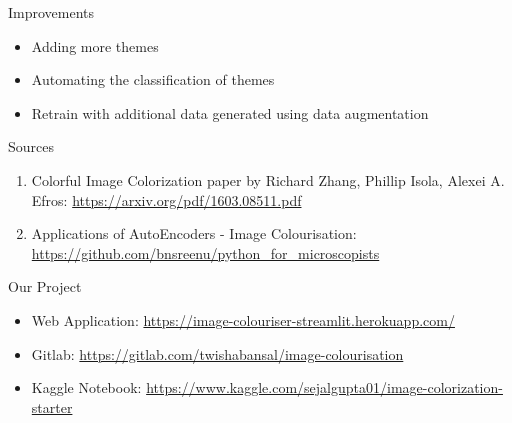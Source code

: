 \documentclass[12pt]{beamer}
\begin{document}
\begin{frame}{Improvements}
	\begin{itemize}
		\item Adding more themes
		\item Automating the classification of themes
		\item Retrain with additional data generated using data augmentation
	\end{itemize}
\end{frame}

\begin{frame}{Sources}
	\begin{enumerate}
		\item Colorful Image Colorization paper by Richard Zhang, Phillip Isola, Alexei A. Efros: \textcolor{cyan}{\href{https://arxiv.org/pdf/1603.08511.pdf}{https://arxiv.org/pdf/1603.08511.pdf}}
		\item Applications of AutoEncoders - Image Colourisation: \textcolor{cyan}{\href{https://github.com/bnsreenu/python\_for\_microscopists}{https://github.com/bnsreenu/python\_for\_microscopists}}
	\end{enumerate}
\end{frame}

\begin{frame}{Our Project}
	\begin{itemize}
		\item Web Application: \textcolor{cyan}{\href{https://image-colouriser-streamlit.herokuapp.com/}{https://image-colouriser-streamlit.herokuapp.com/}}
		\item Gitlab: \textcolor{cyan}{\href{https://gitlab.com/twishabansal/image-colourisation}{https://gitlab.com/twishabansal/image-colourisation}}
		\item Kaggle Notebook: \textcolor{cyan}{\href{https://www.kaggle.com/sejalgupta01/image-colorization-starter}{https://www.kaggle.com/sejalgupta01/image-colorization-starter}}
	\end{itemize}
\end{frame}

\begin{frame}[standout]
\end{frame}
\end{document}
